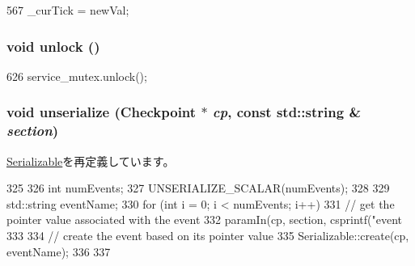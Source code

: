 \begin{DoxyCode}
567 { _curTick = newVal; }
\end{DoxyCode}
\hypertarget{classEventQueue_a9278be8203e1c42e2619179882ae4403}{
\subsubsection[{unlock}]{\setlength{\rightskip}{0pt plus 5cm}void unlock ()}}
\label{classEventQueue_a9278be8203e1c42e2619179882ae4403}



\begin{DoxyCode}
626 { service_mutex.unlock(); }
\end{DoxyCode}
\hypertarget{classEventQueue_af22e5d6d660b97db37003ac61ac4ee49}{
\subsubsection[{unserialize}]{\setlength{\rightskip}{0pt plus 5cm}void unserialize ({\bf Checkpoint} $\ast$ {\em cp}, \/  const std::string \& {\em section})}}
\label{classEventQueue_af22e5d6d660b97db37003ac61ac4ee49}


\hyperlink{classSerializable_af100c4e9feabf3cd918619c88c718387}{Serializable}を再定義しています。


\begin{DoxyCode}
325 {
326     int numEvents;
327     UNSERIALIZE_SCALAR(numEvents);
328 
329     std::string eventName;
330     for (int i = 0; i < numEvents; i++) {
331         // get the pointer value associated with the event
332         paramIn(cp, section, csprintf("event%
333 
334         // create the event based on its pointer value
335         Serializable::create(cp, eventName);
336     }
337 }
\end{DoxyCode}


